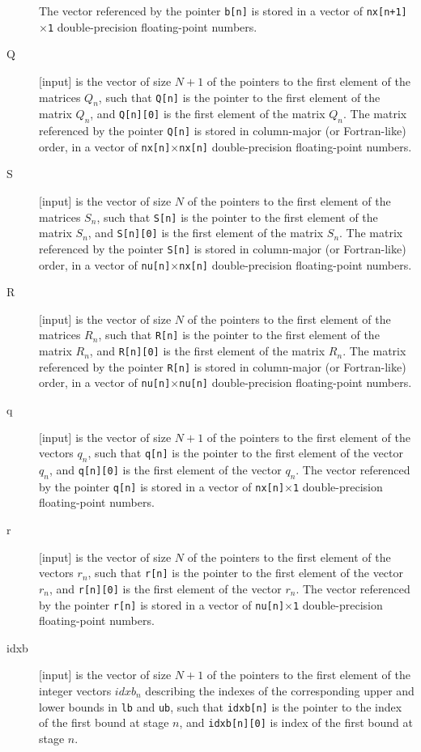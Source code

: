 \documentclass{report}
\begin{document}
\begin{description}
The vector referenced by the pointer {\tt b[n]} is stored in a vector of {\tt nx[n+1]$\times$1} double-precision floating-point numbers.
\item[Q] [input] is the vector of size $N+1$ of the pointers to the first element of the matrices $Q_n$, such that {\tt Q[n]} is the pointer to the first element of the matrix $Q_n$, and {\tt Q[n][0]} is the first element of the matrix $Q_n$.
The matrix referenced by the pointer {\tt Q[n]} is stored in column-major (or Fortran-like) order, in a vector of {\tt nx[n]$\times$nx[n]} double-precision floating-point numbers.
\item[S] [input] is the vector of size $N$ of the pointers to the first element of the matrices $S_n$, such that {\tt S[n]} is the pointer to the first element of the matrix $S_n$, and {\tt S[n][0]} is the first element of the matrix $S_n$.
The matrix referenced by the pointer {\tt S[n]} is stored in column-major (or Fortran-like) order, in a vector of {\tt nu[n]$\times$nx[n]} double-precision floating-point numbers.
\item[R] [input] is the vector of size $N$ of the pointers to the first element of the matrices $R_n$, such that {\tt R[n]} is the pointer to the first element of the matrix $R_n$, and {\tt R[n][0]} is the first element of the matrix $R_n$.
The matrix referenced by the pointer {\tt R[n]} is stored in column-major (or Fortran-like) order, in a vector of {\tt nu[n]$\times$nu[n]} double-precision floating-point numbers.
\item[q] [input] is the vector of size $N+1$ of the pointers to the first element of the vectors $q_n$, such that {\tt q[n]} is the pointer to the first element of the vector $q_n$, and {\tt q[n][0]} is the first element of the vector $q_n$.
The vector referenced by the pointer {\tt q[n]} is stored in a vector of {\tt nx[n]$\times$1} double-precision floating-point numbers.
\item[r] [input] is the vector of size $N$ of the pointers to the first element of the vectors $r_n$, such that {\tt r[n]} is the pointer to the first element of the vector $r_n$, and {\tt r[n][0]} is the first element of the vector $r_n$.
The vector referenced by the pointer {\tt r[n]} is stored in a vector of {\tt nu[n]$\times$1} double-precision floating-point numbers.
\item[idxb] [input] is the vector of size $N+1$ of the pointers to the first element of the integer vectors $idxb_n$ describing the indexes of the corresponding upper and lower bounds in {\tt lb} and {\tt ub}, such that {\tt idxb[n]} is the pointer to the index of the first bound at stage $n$, and {\tt idxb[n][0]} is index of the first bound at stage $n$.

\end{description}
\end{document}
